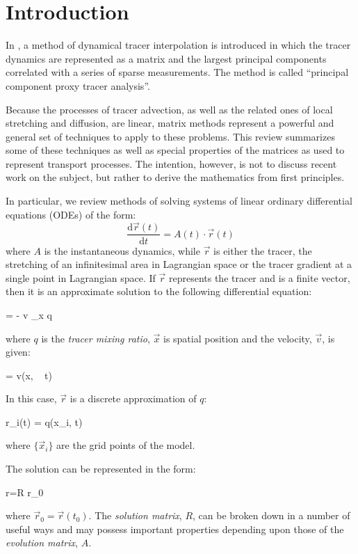 
\section{Introduction}

In \citet{Mills2018}, a method of dynamical tracer interpolation
is introduced
in which the tracer dynamics are represented as a matrix and the largest
principal components correlated with a series of sparse measurements.
The method is called ``principal component proxy tracer analysis''.

Because the processes of tracer advection, as well as the related ones
of local stretching and diffusion, are linear, 
matrix methods represent a powerful and
general set of techniques to apply to these problems.
This review summarizes some of these techniques as well as special properties
of the matrices as used to represent transport processes.  
The intention, however, is not to discuss recent work on the subject, but
rather to derive the mathematics from first principles.

In particular, 
we review methods of solving systems of linear ordinary differential
equations (ODEs) of the form:
\begin{equation}
\frac{\mathrm d \vec r(t)}{\mathrm d t} = A(t) \cdot \vec r(t)
\end{equation}
where $A$ is the instantaneous dynamics, while $\vec r$ is either the tracer,
the stretching of an infinitesimal area in Lagrangian space or the tracer gradient at a single point
in Lagrangian space. 
If $\vec r$ represents the tracer and is a finite vector,
then it is an approximate solution to the following differential equation:
\begin{eqnl}
	 = - \vec v \cdot \nabla_{\vec x} q
\end{eqnl}
where $q$ is the {\it tracer mixing ratio}, $\vec x$ is spatial position and the velocity, $\vec v$, is given:
\begin{eqnl}
	 = \vec v(\vec x, ~ t)
\end{eqnl}
In this case, $\vec r$ is a discrete approximation of $q$:
\begin{eqnl}
	r_i(t) = q(\vec x_i, t)
\end{eqnl}
where $\lbrace \vec x_i \rbrace$ are the grid points of the model.

The solution can be represented in the form:
\begin{eqnl}
	\vec r=R \cdot \vec r_0
\end{eqnl}
where $\vec r_0=\vec r(t_0)$.
The {\it solution matrix}, $R$, can be broken down in a number of useful ways
and may possess important properties depending upon those of
the {\it evolution matrix}, $A$.

